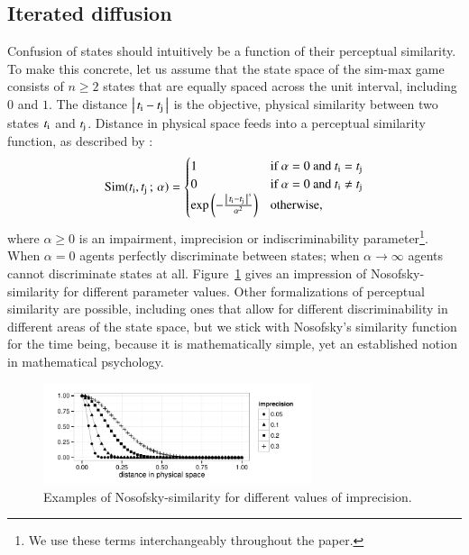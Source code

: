 \documentclass[fleqn,reqno,10pt]{article}
\newcommand{\impairment}{\ensuremath{\alpha}} %
\newcommand{\similarity}{\ensuremath{\mathrm{Sim}}} %
\begin{document}
\subsection{Iterated diffusion}
\label{sec:iterated-diffusion}

Confusion of states should intuitively be a function of their
perceptual similarity. To make this concrete, let us assume that the
state space of the sim-max game consists of $n \ge 2$ states that are
equally spaced across the unit interval, including $0$ and $1$. The
distance $\left \lvert \, t_{\mathrm{i}} - t_{\mathrm{j}} \, \right\rvert$ is the objective, physical
similarity between two states $t_{\mathrm{i}}$ and
$t_{\mathrm{j}}$. Distance in physical space feeds into a perceptual
similarity function, as described by
\citet{Nosofsky1986:Attention-Simil}:
\begin{align*}
  \similarity(\mystate{i}, \mystate{j} \myts ; \myts \impairment) =
      \begin{cases}
    1 & \textrm{if } \impairment = 0 \textrm{ and } \mystate{i} = \mystate{j} \\
    0 & \textrm{if } \impairment = 0 \textrm{ and } \mystate{i} \neq \mystate{j} \\
 \expo \left ( -  \frac{\card{\mystate{i} - \mystate{j}}^s}{ \impairment^2} \right ) & \textrm{otherwise,} \\
    \end{cases}
\end{align*}
where $\impairment \ge 0$ is an impairment, imprecision or indiscriminability
parameter\footnote{We use these terms interchangeably throughout the paper.}.
When $\impairment=0$ agents perfectly discriminate between
states; when $\impairment \rightarrow \infty$ agents cannot
discriminate states at all. Figure~\ref{fig:NosofskySim} gives an
impression of Nosofsky-similarity for different parameter
values. Other formalizations of perceptual similarity are possible,
including ones that allow for different discriminability in different
areas of the state space, but we stick with Nosofsky's similarity
function for the time being, because it is mathematically simple, yet
an established notion in mathematical psychology.

\begin{figure}
  \centering

  \includegraphics[width=0.7\textwidth]{plots/NosofskySim.pdf}

  \caption{Examples of Nosofsky-similarity for different values of
    imprecision.}
  \label{fig:NosofskySim}
\end{figure}
\end{document}
